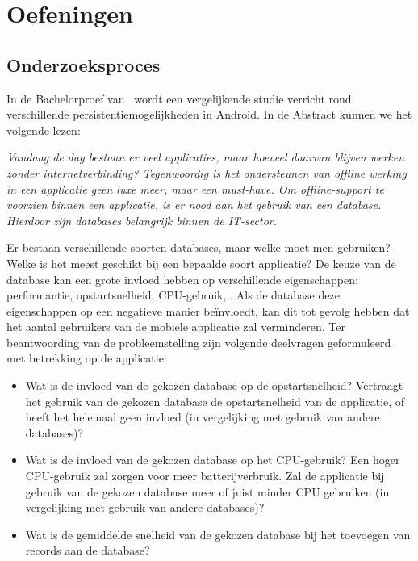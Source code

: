 \section{Oefeningen}
\label{sec:proces-oefeningen}

\subsection{Onderzoeksproces}

In de Bachelorproef van~\textcite{Akin2016} wordt een vergelijkende studie verricht rond verschillende persistentiemogelijkheden in Android. In de Abstract kunnen we het volgende lezen:

\begin{displayquote}
  \itshape
  Vandaag de dag bestaan er veel applicaties, maar hoeveel daarvan blijven werken zonder internetverbinding? Tegenwoordig is het ondersteunen van offline werking in een applicatie geen luxe meer, maar een must-have. Om offline-support te voorzien binnen een applicatie, is er nood aan het gebruik van een database. Hierdoor zijn databases belangrijk binnen de IT-sector.
  
  Er bestaan verschillende soorten databases, maar welke moet men gebruiken?
  Welke is het meest geschikt bij een bepaalde soort applicatie? De keuze van de database kan een grote invloed hebben op verschillende eigenschappen: performantie, opstartsnelheid, CPU-gebruik,.. Als de database deze eigenschappen op een negatieve manier be\"invloedt, kan dit tot gevolg hebben dat het aantal gebruikers van de mobiele applicatie zal verminderen. Ter beantwoording van de probleemstelling zijn volgende deelvragen geformuleerd met betrekking op de applicatie:

  \begin{itemize}
    \item 	Wat is de invloed van de gekozen database op de opstartsnelheid? Vertraagt het gebruik van de gekozen database de opstartsnelheid van de applicatie, of heeft het helemaal geen invloed (in vergelijking met gebruik van andere databases)?
    \item Wat is de invloed van de gekozen database op het CPU-gebruik? Een hoger
    CPU-gebruik zal zorgen voor meer batterijverbruik. Zal de applicatie bij gebruik van de gekozen database meer of juist minder CPU gebruiken (in vergelijking met gebruik van andere databases)?
    \item  Wat is de gemiddelde snelheid van de gekozen database bij het toevoegen van records aan de database?
  \end{itemize}
  

\end{displayquote}
